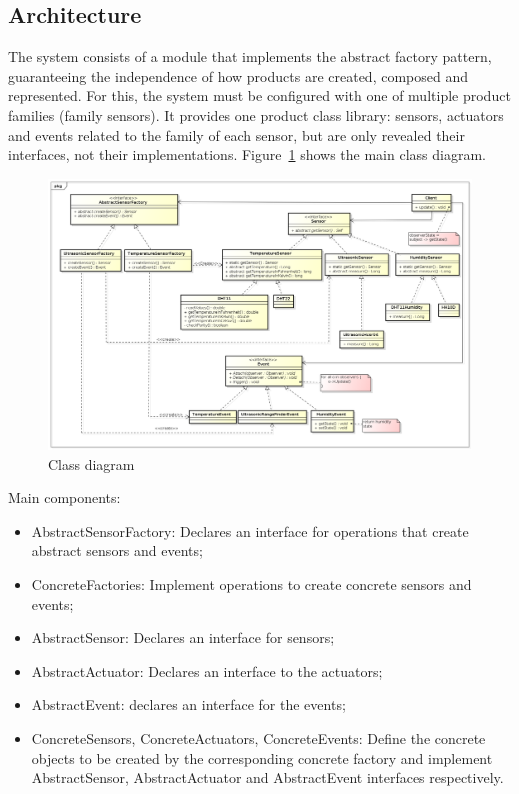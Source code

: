 \documentclass{acm_proc_article-sp}
\begin{document}
\subsection{Architecture}
The system consists of a module that implements the abstract factory pattern, guaranteeing the independence of how products are created, composed and represented. For this, the system must be configured with one of multiple product families (family sensors). It provides one product class library: sensors, actuators and events related to the family of each sensor, but are only revealed their interfaces, not their implementations. Figure~\ref{fig:classDiagram} shows the main class diagram.
\begin{figure}[ht]
    \includegraphics[width=1.0\textwidth,natwidth=610,natheight=642]{pictures/ClassDiagram.png}
    \caption{Class diagram}
    \label{fig:classDiagram}
\end{figure}

Main components:
\begin{itemize}
\item AbstractSensorFactory: Declares an interface for operations that create abstract sensors and events;
\item ConcreteFactories: Implement operations to create concrete sensors and events;
\item AbstractSensor: Declares an interface for sensors;
\item AbstractActuator: Declares an interface to the actuators;
\item AbstractEvent: declares an interface for the events;
\item ConcreteSensors, ConcreteActuators, ConcreteEvents: Define the concrete objects to be created by the corresponding concrete factory and implement AbstractSensor, AbstractActuator and AbstractEvent interfaces respectively.

\end{itemize}
\end{document}
